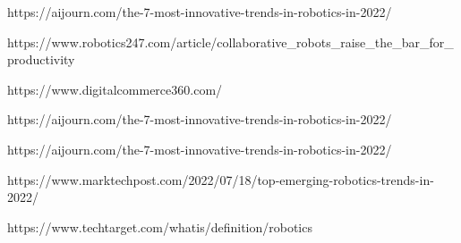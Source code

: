 \documentclass{report}
\begin{document}
\begin{thebibliography}{99}

https://aijourn.com/the-7-most-innovative-trends-in-robotics-in-2022/

https://www.robotics247.com/article/collaborative\_robots\_raise\_the\_bar\_for\_productivity

https://www.digitalcommerce360.com/

https://aijourn.com/the-7-most-innovative-trends-in-robotics-in-2022/

https://aijourn.com/the-7-most-innovative-trends-in-robotics-in-2022/

https://www.marktechpost.com/2022/07/18/top-emerging-robotics-trends-in-2022/

https://www.techtarget.com/whatis/definition/robotics


\end{thebibliography}
\end{document}
